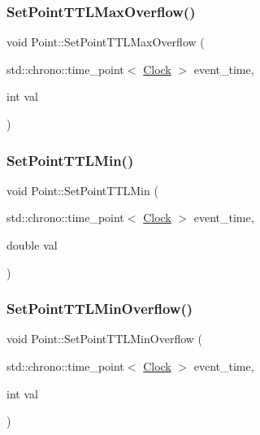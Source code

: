 \mbox{\label{classPoint_a6a7ca43c551232d5c5d0f5a5d8603c9e}} 
\subsubsection{\texorpdfstring{Set\+Point\+T\+T\+L\+Max\+Overflow()}{SetPointTTLMaxOverflow()}}
{\footnotesize\ttfamily void Point\+::\+Set\+Point\+T\+T\+L\+Max\+Overflow (\begin{DoxyParamCaption}\item[{std\+::chrono\+::time\+\_\+point$<$ \mbox{\hyperlink{universe_8h_a0ef8d951d1ca5ab3cfaf7ab4c7a6fd80}{Clock}} $>$}]{event\+\_\+time,  }\item[{int}]{val }\end{DoxyParamCaption})\hspace{0.3cm}{\ttfamily [inline]}}

\mbox{\label{classPoint_ae36f75ff4e27742000acd8cad7743614}} 
\subsubsection{\texorpdfstring{Set\+Point\+T\+T\+L\+Min()}{SetPointTTLMin()}}
{\footnotesize\ttfamily void Point\+::\+Set\+Point\+T\+T\+L\+Min (\begin{DoxyParamCaption}\item[{std\+::chrono\+::time\+\_\+point$<$ \mbox{\hyperlink{universe_8h_a0ef8d951d1ca5ab3cfaf7ab4c7a6fd80}{Clock}} $>$}]{event\+\_\+time,  }\item[{double}]{val }\end{DoxyParamCaption})\hspace{0.3cm}{\ttfamily [inline]}}

\mbox{\label{classPoint_a167884648fa6ce217472edfdbf515ac3}} 
\subsubsection{\texorpdfstring{Set\+Point\+T\+T\+L\+Min\+Overflow()}{SetPointTTLMinOverflow()}}
{\footnotesize\ttfamily void Point\+::\+Set\+Point\+T\+T\+L\+Min\+Overflow (\begin{DoxyParamCaption}\item[{std\+::chrono\+::time\+\_\+point$<$ \mbox{\hyperlink{universe_8h_a0ef8d951d1ca5ab3cfaf7ab4c7a6fd80}{Clock}} $>$}]{event\+\_\+time,  }\item[{int}]{val }\end{DoxyParamCaption})\hspace{0.3cm}{\ttfamily [inline]}}

